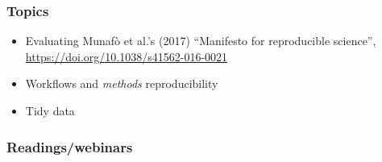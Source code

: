 \documentclass[
]{article}
\providecommand{\tightlist}{%
  \setlength{\itemsep}{0pt}\setlength{\parskip}{0pt}}
\begin{document}
\hypertarget{topics-2}{%
\subsubsection{Topics}\label{topics-2}}

\begin{itemize}
\tightlist
\item
  Evaluating Munafò et al.'s (2017) ``Manifesto for reproducible
  science'', \url{https://doi.org/10.1038/s41562-016-0021}
\item
  Workflows and \emph{methods} reproducibility
\item
  Tidy data
\end{itemize}

\hypertarget{readingswebinars-1}{%
\subsubsection{Readings/webinars}\label{readingswebinars-1}}
\end{document}
